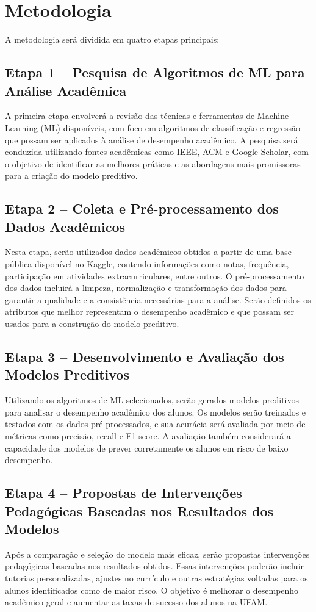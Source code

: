\documentclass[12pt]{article}
\begin{document}
\section{Metodologia}
A metodologia será dividida em quatro etapas principais:

\subsection{Etapa 1 – Pesquisa de Algoritmos de ML para Análise Acadêmica}
A primeira etapa envolverá a revisão das técnicas e ferramentas de Machine Learning (ML) disponíveis, com foco em algoritmos de classificação e regressão que possam ser aplicados à análise de desempenho acadêmico. A pesquisa será conduzida utilizando fontes acadêmicas como IEEE, ACM e Google Scholar, com o objetivo de identificar as melhores práticas e as abordagens mais promissoras para a criação do modelo preditivo.

\subsection{Etapa 2 – Coleta e Pré-processamento dos Dados Acadêmicos}
Nesta etapa, serão utilizados dados acadêmicos obtidos a partir de uma base pública disponível no Kaggle, contendo informações como notas, frequência, participação em atividades extracurriculares, entre outros. O pré-processamento dos dados incluirá a limpeza, normalização e transformação dos dados para garantir a qualidade e a consistência necessárias para a análise. Serão definidos os atributos que melhor representam o desempenho acadêmico e que possam ser usados para a construção do modelo preditivo.

\subsection{Etapa 3 – Desenvolvimento e Avaliação dos Modelos Preditivos}
Utilizando os algoritmos de ML selecionados, serão gerados modelos preditivos para analisar o desempenho acadêmico dos alunos. Os modelos serão treinados e testados com os dados pré-processados, e sua acurácia será avaliada por meio de métricas como precisão, recall e F1-score. A avaliação também considerará a capacidade dos modelos de prever corretamente os alunos em risco de baixo desempenho.

\subsection{Etapa 4 – Propostas de Intervenções Pedagógicas Baseadas nos Resultados dos Modelos}
Após a comparação e seleção do modelo mais eficaz, serão propostas intervenções pedagógicas baseadas nos resultados obtidos. Essas intervenções poderão incluir tutorias personalizadas, ajustes no currículo e outras estratégias voltadas para os alunos identificados como de maior risco. O objetivo é melhorar o desempenho acadêmico geral e aumentar as taxas de sucesso dos alunos na UFAM.
\end{document}
